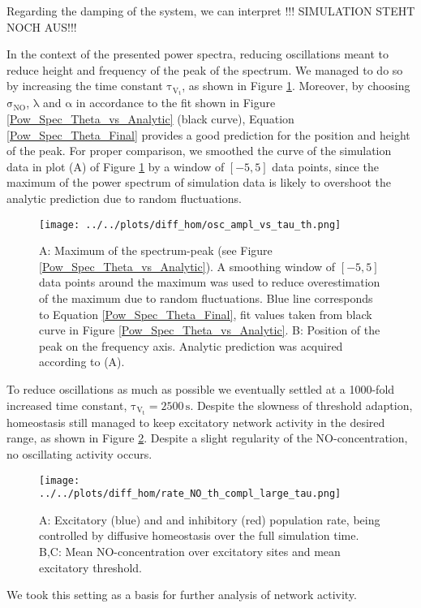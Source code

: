 \documentclass[10pt,a4paper]{article}
\begin{document}
Regarding the damping of the system, we can interpret   !!! SIMULATION STEHT NOCH AUS!!! 

In the context of the presented power spectra, reducing oscillations meant to reduce height and frequency of the peak of the spectrum. We managed to do so by increasing the time constant $\mathrm{\tau_{V_t}}$, as shown in Figure \ref{Peak_Prop_vs_Theta}. Moreover, by choosing $\mathrm{\sigma_{NO}}$, $\mathrm{\lambda}$ and $\mathrm{\alpha}$ in accordance to the fit shown in Figure \ref{Pow_Spec_Theta_vs_Analytic} (black curve), Equation \eqref{Pow_Spec_Theta_Final} provides a good prediction for the position and height of the peak. For proper comparison, we smoothed the curve of the simulation data in plot (A) of Figure \ref{Peak_Prop_vs_Theta} by a window of $\mathrm{[-5,5]}$ data points, since the maximum of the power spectrum of simulation data is likely to overshoot the analytic prediction due to random fluctuations.  
\begin{figure}
\texttt{[image: ../../plots/diff\_hom/osc\_ampl\_vs\_tau\_th.png]}
\caption{A: Maximum of the spectrum-peak (see Figure \ref{Pow_Spec_Theta_vs_Analytic}). A smoothing window of $\mathrm{[-5,5]}$ data points around the maximum was used to reduce overestimation of the maximum due to random fluctuations. Blue line corresponds to Equation \eqref{Pow_Spec_Theta_Final}, fit values taken from black curve in Figure \ref{Pow_Spec_Theta_vs_Analytic}. B: Position of the peak on the frequency axis. Analytic prediction was acquired according to (A).}
\label{Peak_Prop_vs_Theta}
\end{figure} 
To reduce oscillations as much as possible we eventually settled at a 1000-fold increased time constant, $\mathrm{\tau_{V_t}=2500\,s}$. Despite the slowness of threshold adaption, homeostasis still managed to keep excitatory network activity in the desired range, as shown in Figure \ref{full_sim_osci_slow_tau_th}. Despite a slight regularity of the NO-concentration, no oscillating activity occurs.  
\begin{figure}
\texttt{[image: ../../plots/diff\_hom/rate\_NO\_th\_compl\_large\_tau.png]}
\caption{A: Excitatory (blue) and and inhibitory (red) population rate, being controlled by diffusive homeostasis over the full simulation time. B,C: Mean NO-concentration over excitatory sites and mean excitatory threshold.}
\label{full_sim_osci_slow_tau_th}
\end{figure}
We took this setting as a basis for further analysis of network activity.
\end{document}
